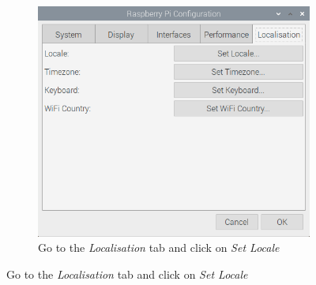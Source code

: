 \documentclass{article}
\begin{document}
\begin{figure}[h]
\begin{subfigure}[t]{0.49\textwidth}
        \includegraphics[width=\textwidth]{lang1.png}
        \caption{Go to the \emph{Localisation} tab and click on \emph{Set Locale}}
    \end{subfigure}
\end{figure}
\end{document}
